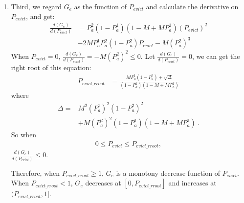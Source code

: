 \begin{enumerate}
\item
 Third, we regard $G_e$ as the function of $P_{evict}$ and calculate the derivative on $P_{evict}$, and get:
\begin{equation}
\begin{split}
\frac{d(G_e)}{d(P_{evict})} &= P_{a}^{\mathfrak{2}}(1-P_{a}^{\mathfrak{1}})(1-M+MP_{a}^{\mathfrak{1}})(P_{evict})^2\\
&-2MP_{a}^{\mathfrak{1}}P_{a}^{\mathfrak{2}}(1-P_{a}^{\mathfrak{2}})P_{evict}-M(P_{a}^{\mathfrak{2}})^3
\end{split}
\end{equation}
When $P_{evict} = 0$, $\frac{d(G_e)}{d(P_{evict})} = -M(P_{a}^{\mathfrak{2}})^2 \leq 0 $.
Let $\frac{d(G_e)}{d(P_{evict})} = 0$, we can get the right root of this equation:
\begin{equation}
\begin{split}
P_{evict\_rroot} &= \frac{MP_{a}^{\mathfrak{1}}(1-P_{a}^{\mathfrak{2}})+\sqrt{\Delta}}{(1-P_{a}^{\mathfrak{1}})(1-M+MP_{a}^{\mathfrak{1}})}
\end{split}
\end{equation}
where 
\begin{align}
\Delta = &M^{2}(P_{a}^{\mathfrak{1}})^{2}(1-P_{a}^{\mathfrak{2}})^2 \nonumber \\
&+ M(P_{a}^{\mathfrak{2}})^{2}(1-P_{a}^\mathfrak{1})(1-M+MP_{a}^{\mathfrak{1}})\  .\nonumber
\end{align}
So when
\begin{equation}
\begin{split}
0 \leq P_{evict} \leq P_{evict\_rroot},
\end{split}
\end{equation}
$\frac{d(G_e)}{d(P_{evict})} \leq 0$.

Therefore, when $P_{evict\_rroot} \geq 1$, $G_e$ is a monotony decrease function of $P_{evict}$.
When $P_{evict\_rroot} < 1$, $G_e$ decreases at $[0,P_{evict\_rroot}]$ and increases at $(P_{evict\_rroot},1]$.


\end{enumerate}
